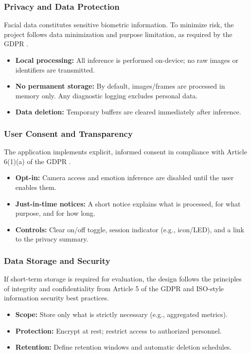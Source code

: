 \documentclass[12pt,a4paper]{article}
\begin{document}
\subsubsection{Privacy and Data Protection}
Facial data constitutes sensitive biometric information. To minimize risk, the project follows data minimization and purpose limitation, as required by the GDPR \cite{gdpr}. 
\begin{itemize}
  \item \textbf{Local processing:} All inference is performed on-device; no raw images or identifiers are transmitted.
  \item \textbf{No permanent storage:} By default, images/frames are processed in memory only. Any diagnostic logging excludes personal data.
  \item \textbf{Data deletion:} Temporary buffers are cleared immediately after inference.
\end{itemize}

\subsubsection{User Consent and Transparency}
The application implements explicit, informed consent in compliance with Article 6(1)(a) of the GDPR \cite{gdpr}.
\begin{itemize}
  \item \textbf{Opt-in:} Camera access and emotion inference are disabled until the user enables them.
  \item \textbf{Just-in-time notices:} A short notice explains what is processed, for what purpose, and for how long.
  \item \textbf{Controls:} Clear on/off toggle, session indicator (e.g., icon/LED), and a link to the privacy summary.
\end{itemize}

\subsubsection{Data Storage and Security}
If short-term storage is required for evaluation, the design follows the principles of integrity and confidentiality from Article 5 of the GDPR \cite{gdpr} and ISO-style information security best practices.
\begin{itemize}
  \item \textbf{Scope:} Store only what is strictly necessary (e.g., aggregated metrics).
  \item \textbf{Protection:} Encrypt at rest; restrict access to authorized personnel.
  \item \textbf{Retention:} Define retention windows and automatic deletion schedules.
\end{itemize}
\end{document}

